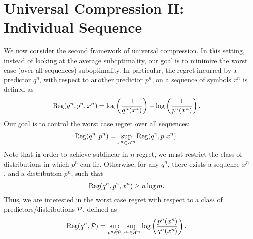 \section{Universal Compression II: Individual Sequence}
\label{sec:universal-compression-individual}
    We now consider the second framework of universal compression. In this setting, instead of looking at the average suboptimality, our goal is to minimize the worst case (over all sequences) suboptimality. In particular, the regret incurred by a predictor $q^n$, with respect to another predictor $p^n$, on a sequence of symbols $x^n$ is defined as 
    \begin{align}
        \text{Reg}(q^n, p^n, x^n) = \log \left( \frac{1}{q^n(x^n)} \right)  - \log \left( \frac{1}{p^n(x^n)} \right).  
    \end{align}
    Our goal is to control the worst case regret over all sequences: 
    \begin{align}
        \text{Reg}(q^n, p^n) = \sup_{x^n \in \mathcal{X}^n} \text{Reg}(q^n, p^, x^n). 
    \end{align}
    Note that in order to achieve sublinear in $n$ regret, we must restrict the class of distributions in which $p^n$ can lie. Otherwise, for any $q^n$, there exists a sequence $x^n$, and a distribution $p^n$, such that 
    \begin{align}
        \text{Reg}(q^n, p^n, x^n) \geq n \log m. 
    \end{align}
    Thus, we are interested in the worst case regret with respect to a class of predictors/distributions $\mathcal{P}$, defined as 
    \begin{align}
        \text{Reg}(q^n, \mathcal{P}) = \sup_{p^n \in \mathcal{P}}  \sup_{x^n \in \mathcal{X}^n} \log \left( \frac{p^n(x^n)}{q^n(x^n)} \right). \label{eq:minimax-regret}
    \end{align}

